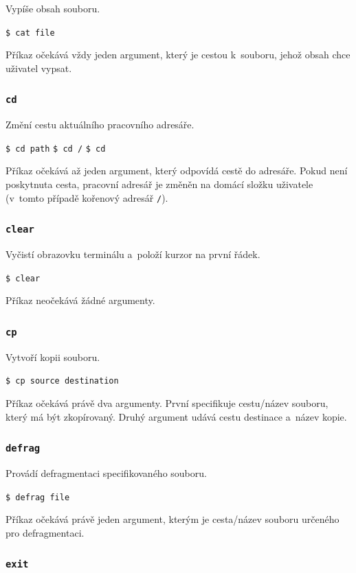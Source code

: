 \documentclass[12pt]{article}
\begin{document}
Vypíše obsah souboru.

\texttt{\$ cat file}

Příkaz očekává vždy jeden argument, který je cestou k~souboru, jehož obsah chce uživatel vypsat.

\subsubsection{\texttt{cd}}\label{sec:cd}

Změní cestu aktuálního pracovního adresáře.

\texttt{\$ cd path}\qquad
\texttt{\$ cd /}\qquad
\texttt{\$ cd}

Příkaz očekává až jeden argument, který odpovídá cestě do adresáře.
Pokud není pos\-kytnuta cesta, pracovní adresář je změněn na domácí složku uživatele (v~tomto případě kořenový adresář \texttt{/}).

\subsubsection{\texttt{clear}}\label{sec:clear}

Vyčistí obrazovku terminálu a~položí kurzor na první řádek.

\texttt{\$ clear}

Příkaz neočekává žádné argumenty.

\subsubsection{\texttt{cp}}\label{sec:cp}

Vytvoří kopii souboru.

\texttt{\$ cp source destination}

Příkaz očekává právě dva argumenty.
První specifikuje cestu/název souboru, který má být zkopírovaný.
Druhý argument udává cestu destinace a~název kopie.

\subsubsection{\texttt{defrag}}\label{sec:defrag}

Provádí defragmentaci specifikovaného souboru.

\texttt{\$ defrag file}

Příkaz očekává právě jeden argument, kterým je cesta/název souboru určeného pro defragmentaci.

\subsubsection{\texttt{exit}}\label{sec:exit}
\end{document}
